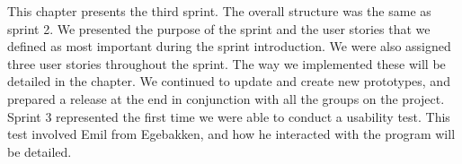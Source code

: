 This chapter presents the third sprint.
The overall structure was the same as sprint 2.
We presented the purpose of the sprint and the user stories that we defined as most important during the sprint introduction.
We were also assigned three user stories throughout the sprint.
The way we implemented these will be detailed in the chapter.
We continued to update and create new prototypes, and prepared a release at the end in conjunction with all the groups on the project.
Sprint 3 represented the first time we were able to conduct a usability test. 
This test involved Emil from Egebakken, and how he interacted with the program will be detailed.